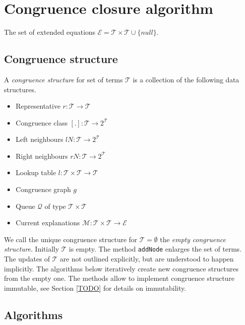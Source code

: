 \section*{Congruence closure algorithm}
\label{sec:algorithm}
The set of extended equations $\mathcal{E} = \mathcal{T} \times \mathcal{T} \cup \{null\}$.

\subsection*{Congruence structure}

A \emph{congruence structure} for set of terms $\mathcal{T}$ is a collection of the following data structures.

\begin{itemize}
	\item Representative $r: \mathcal{T} \rightarrow \mathcal{T}$
	\item Congruence class $[.]: \mathcal{T} \rightarrow 2^\mathcal{T}$
	\item Left neighbours $lN: \mathcal{T} \rightarrow 2^\mathcal{T}$
	\item Right neighbours $rN: \mathcal{T} \rightarrow 2^\mathcal{T}$
	\item Lookup table $l: \mathcal{T} \times \mathcal{T} \rightarrow \mathcal{T}$
	\item Congruence graph $g$
	\item Queue $\mathcal{Q}$ of type $\mathcal{T} \times \mathcal{T}$
	\item Current explanations $\mathcal{M}: \mathcal{T} \times \mathcal{T} \rightarrow \mathcal{E}$
\end{itemize}

We call the unique congruence structure for $\mathcal{T} = \emptyset$ the \emph{empty congruence structure}.
Initially $\mathcal{T}$ is empty.
The method \texttt{addNode} enlarges the set of terms.
The updates of $\mathcal{T}$ are not outlined explicitly, but are understood to happen implicitly.
The algorithms below iteratively create new congruence structures from the empty one.
The methods allow to implement congruence structure immutable, see Section \ref{TODO} for details on immutability.

\subsection*{Algorithms}

